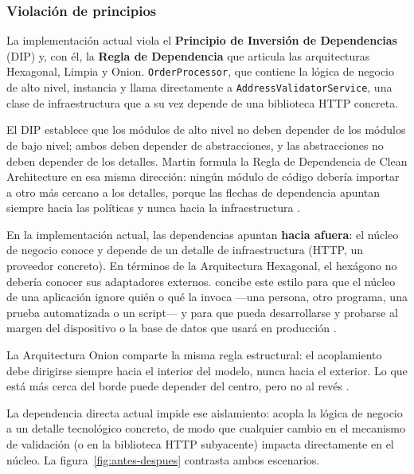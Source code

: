 \subsubsection{Violación de principios}
La implementación actual viola el \textbf{Principio de Inversión de Dependencias} (DIP) y, con él, la \textbf{Regla de Dependencia} que articula las arquitecturas Hexagonal, Limpia y Onion. \texttt{OrderProcessor}, que contiene la lógica de negocio de alto nivel, instancia y llama directamente a \texttt{AddressValidatorService}, una clase de infraestructura que a su vez depende de una biblioteca HTTP concreta.

El DIP establece que los módulos de alto nivel no deben depender de los módulos de bajo nivel; ambos deben depender de abstracciones, y las abstracciones no deben depender de los detalles. Martin formula la Regla de Dependencia de Clean Architecture en esa misma dirección: ningún módulo de código debería importar a otro más cercano a los detalles, porque las flechas de dependencia apuntan siempre hacia las políticas y nunca hacia la infraestructura \parencite{martin2017clean}.

En la implementación actual, las dependencias apuntan \textbf{hacia afuera}: el núcleo de negocio conoce y depende de un detalle de infraestructura (HTTP, un proveedor concreto). En términos de la Arquitectura Hexagonal, el hexágono no debería conocer sus adaptadores externos. \textcite{cockburn2005hexagonal} concibe este estilo para que el núcleo de una aplicación ignore quién o qué la invoca ---una persona, otro programa, una prueba automatizada o un script--- y para que pueda desarrollarse y probarse al margen del dispositivo o la base de datos que usará en producción \parencite{cockburn2005hexagonal}.

La Arquitectura Onion comparte la misma regla estructural: el acoplamiento debe dirigirse siempre hacia el interior del modelo, nunca hacia el exterior. Lo que está más cerca del borde puede depender del centro, pero no al revés \parencite{palermo2008onion}.

La dependencia directa actual impide ese aislamiento: acopla la lógica de negocio a un detalle tecnológico concreto, de modo que cualquier cambio en el mecanismo de validación (o en la biblioteca HTTP subyacente) impacta directamente en el núcleo. La figura~\ref{fig:antes-despues} contrasta ambos escenarios.

